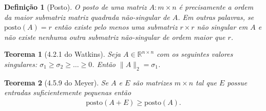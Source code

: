 \documentclass[a4paper,12pt, leqno, answers]{exam}
\newtheorem{defi}{Defini\c{c}\~{a}o}
\newtheorem{theorem}{Teorema}
\begin{document}
\thispagestyle{empty}

\newpage
\setcounter{page}{1}
\begin{defi}[Posto\nocite{Meyer:2000:matrix}]
    O posto de uma matriz $A : m \times n$ \'{e} precisamente a ordem da maior submatriz matriz quadrada n\~{a}o-singular de $A$. Em outras palavras, se $\mathrm{posto}(A) = r$ ent\~{a}o existe pelo menos uma submatriz $r \times r$ n\~{a}o singular em $A$ e n\~{a}o existe nenhuma outra submatriz n\~{a}o-singular de ordem maior que $r$.
\end{defi}
\begin{theorem}[4.2.1 do Watkins\nocite{Watkins:2004:fundamentals}]
    Seja $A \in \mathbb{R}^{n \times n}$ com os seguintes valores singulares: $\sigma_1 \geq \sigma_2 \geq \ldots \geq 0$. Ent\~{a}o $\| A \|_2 = \sigma_1$.
\end{theorem}
\begin{theorem}[4.5.9 do Meyer\nocite{Meyer:2000:matrix}]
    Se $A$ e $E$ s\~{a}o matrizes $m \times n$ tal que $E$ possue entradas suficientemente pequenas ent\~{a}o
    \begin{align*}
        \mathrm{posto}(A + E) \geq \mathrm{posto}(A).
    \end{align*}
\end{theorem}
\end{document}
